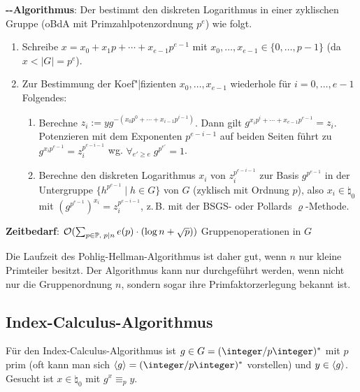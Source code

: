 \textbf{--Algorithmus}:
Der  bestimmt den diskreten Logarithmus
in einer zyklischen Gruppe (oBdA mit Primzahlpotenzordnung $p^e$) wie folgt.
\begin{enumerate}
    \item
    Schreibe $x = x_0 + x_1 p + \dotsb + x_{e-1} p^{e-1}$ mit
    $x_0, \dotsc, x_{e-1} \in \{0, \dotsc, p-1\}$
    (da $x < |G| = p^e$).
    
    \item
    Zur Bestimmung der Koef"|fizienten $x_0, \dotsc, x_{e-1}$ wiederhole für
    $i = 0, \dotsc, e - 1$ Folgendes:
    \begin{enumerate}
        \item
        Berechne $z_i := yg^{-(x_0 p^0 + \dotsb + x_{i-1} p^{i-1})}$.
        Dann gilt $g^{x_i p^i + \dotsb + x_{e-1} p^{e-1}} = z_i$.
        Potenzieren mit dem Exponenten $p^{e-i-1}$ auf beiden Seiten führt zu
        $g^{x_i p^{e-1}} = z_i^{p^{e-i-1}}$ wg. $\forall_{e' \ge e}\; g^{p^{e'}} = 1$.
        
        \item
        Berechne den diskreten Logarithmus $x_i$ von $z_i^{p^{e-i-1}}$ zur Basis $g^{p^{e-1}}$
        in der Untergruppe $\{h^{p^{e-1}} \;|\; h \in G\}$ von $G$
        (zyklisch mit Ordnung $p$),
        also $x_i \in \natural_0$ mit $(g^{p^{e-1}})^{x_i} = z_i^{p^{e-i-1}}$,
        z.\,B. mit der BSGS- oder Pollards $\varrho$-Methode.
    \end{enumerate}
\end{enumerate}

\linie

\textbf{Zeitbedarf}:
$\mathcal{O}(\sum_{p \in \mathbb{P},\; p \mid n} e(p) \cdot (\log n + \sqrt{p}))$ Gruppenoperationen in $G$

Die Laufzeit des Pohlig-Hellman-Algorithmus ist daher gut, wenn $n$ nur kleine Primteiler besitzt.
Der Algorithmus kann nur durchgeführt werden, wenn nicht nur die Gruppenordnung $n$,
sondern sogar ihre Primfaktorzerlegung bekannt ist.

\pagebreak

\subsection{%
    Index-Calculus-Algorithmus%
}

Für den Index-Calculus-Algorithmus ist $g \in G = (\ZpZ)^\ast$ mit $p$ prim
(oft kann man sich $\erzeugnis{g} = (\ZpZ)^\ast$ vorstellen) und $y \in \langle g\rangle$.
Gesucht ist $x \in \natural_0$ mit $g^x \equiv_p y$.

